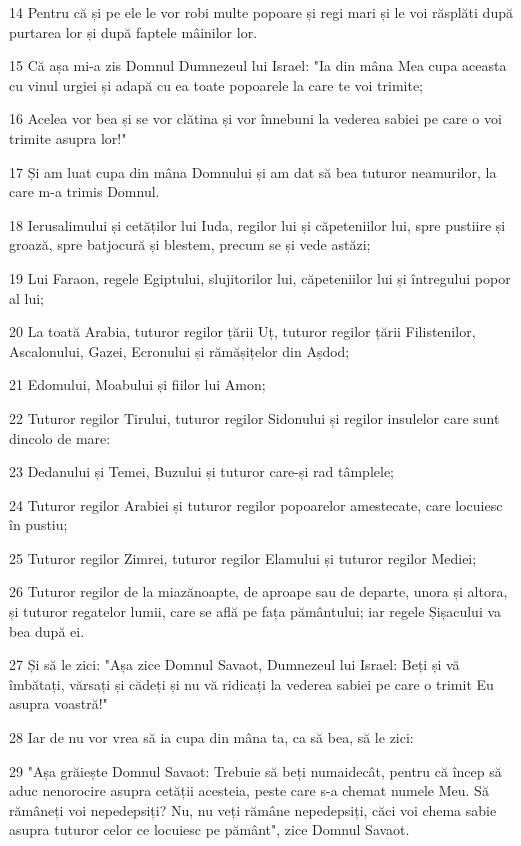 \par 14 Pentru că și pe ele le vor robi multe popoare și regi mari și le voi răsplăti după purtarea lor și după faptele mâinilor lor.
\par 15 Că așa mi-a zis Domnul Dumnezeul lui Israel: "Ia din mâna Mea cupa aceasta cu vinul urgiei și adapă cu ea toate popoarele la care te voi trimite;
\par 16 Acelea vor bea și se vor clătina și vor înnebuni la vederea sabiei pe care o voi trimite asupra lor!"
\par 17 Și am luat cupa din mâna Domnului și am dat să bea tuturor neamurilor, la care m-a trimis Domnul.
\par 18 Ierusalimului și cetăților lui Iuda, regilor lui și căpeteniilor lui, spre pustiire și groază, spre batjocură și blestem, precum se și vede astăzi;
\par 19 Lui Faraon, regele Egiptului, slujitorilor lui, căpeteniilor lui și întregului popor al lui;
\par 20 La toată Arabia, tuturor regilor țării Uț, tuturor regilor țării Filistenilor, Ascalonului, Gazei, Ecronului și rămășițelor din Așdod;
\par 21 Edomului, Moabului și fiilor lui Amon;
\par 22 Tuturor regilor Tirului, tuturor regilor Sidonului și regilor insulelor care sunt dincolo de mare:
\par 23 Dedanului și Temei, Buzului și tuturor care-și rad tâmplele;
\par 24 Tuturor regilor Arabiei și tuturor regilor popoarelor amestecate, care locuiesc în pustiu;
\par 25 Tuturor regilor Zimrei, tuturor regilor Elamului și tuturor regilor Mediei;
\par 26 Tuturor regilor de la miazănoapte, de aproape sau de departe, unora și altora, și tuturor regatelor lumii, care se află pe fața pământului; iar regele Șișacului va bea după ei.
\par 27 Și să le zici: "Așa zice Domnul Savaot, Dumnezeul lui Israel: Beți și vă îmbătați, vărsați și cădeți și nu vă ridicați la vederea sabiei pe care o trimit Eu asupra voastră!"
\par 28 Iar de nu vor vrea să ia cupa din mâna ta, ca să bea, să le zici:
\par 29 "Așa grăiește Domnul Savaot: Trebuie să beți numaidecât, pentru că încep să aduc nenorocire asupra cetății acesteia, peste care s-a chemat numele Meu. Să rămâneți voi nepedepsiți? Nu, nu veți rămâne nepedepsiți, căci voi chema sabie asupra tuturor celor ce locuiesc pe pământ", zice Domnul Savaot.
